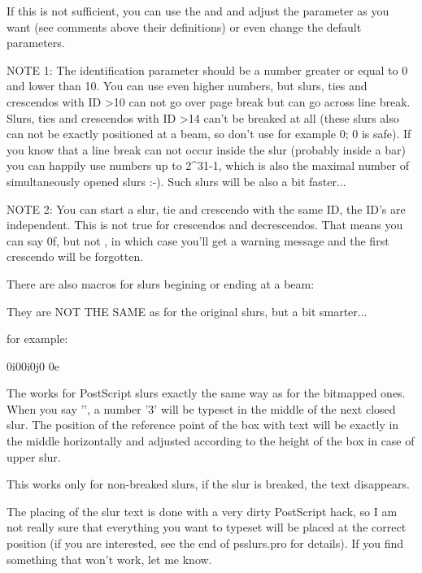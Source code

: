 If this is not sufficient, you can use the \iSlur and \tSlur and adjust the
parameter as you want (see comments above their definitions) or even change
the default parameters.

NOTE 1: The identification parameter should be a number greater
        or equal to 0 and lower than 10. You can use even higher
        numbers, but slurs, ties and crescendos with ID >10
        can not go over page break but can go across line break.
        Slurs, ties and crescendos with ID >14 can't be breaked at all
        (these slurs also can not be exactly positioned at a beam, so
        don't use for example 0; 0 is safe).
        If you know that a line break can not occur inside the slur
        (probably inside a bar) you can happily use numbers
        up to 2^31-1, which is also the maximal number of
        simultaneously opened slurs :-). Such slurs will be also
        a bit faster...

NOTE 2: You can start a slur, tie and crescendo with the same ID,
		  the ID's are independent. This is not true for crescendos
        and decrescendos. That means you can say \isluru0f,
        but not , in which case you'll get a warning
        message and the first crescendo will be forgotten.

There are also macros for slurs begining or ending at a beam:


They are NOT THE SAME as for the original slurs, but a bit smarter...

for example:

\Notes\ibu0i0\qb0i\ibu0j0%
  \qb0e\en

The \slurtext works for PostScript slurs exactly the same way as
for the bitmapped ones. When you say '', a number '3' will
be typeset in the middle of the next closed slur.
The position of the reference point of the box with text will be
exactly in the middle horizontally and adjusted according to the
height of the box in case of upper slur.

This works only for non-breaked slurs, if the slur is breaked,
the text disappears.

The placing of the slur text is done with a very dirty PostScript
hack, so I am not really sure that everything you want to typeset
will be placed at the correct position (if you are interested, see
the end of psslurs.pro for details). If you find something that won't
work, let me know.

